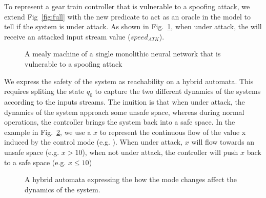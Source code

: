 To represent a gear train controller that is vulnerable to a spoofing attack, we extend Fig~\ref{fig:full} with the new predicate \isUnderAttack to act as an oracle in the model to tell if the system is under attack.
As shown in Fig.~\ref{fig:fullAtk}, when under attack, the \fullNN will receive an attacked input stream value ($speed_{ATK}$).

\begin{figure}[h!]
\centering
{}
\caption{A mealy machine of a single monolithic neural network that is vulnerable to a spoofing attack}
\label{fig:fullAtk}
\end{figure}

We express the safety of the system as reachability on a hybrid automata.
This requires spliting the state $q_0$ to capture the two different dynamics of the systems according to the inputs streams.
The inuition is that when under attack, the dynamics of the system approach some unsafe space, whereas during normal operations, the controller brings the system back into a safe space.
In the example in Fig.~\ref{fig:hybridGear}, we use a $\dot{x}$ to represent the continuous flow of the value x induced by the control mode (e.g. \fullNN).
When under attack, $x$ will flow towards an unsafe space (e.g. $x > 10$), when not under attack, the controller will push $x$ back to a safe space (e.g. $x\leq 10$)

\begin{figure}[h!]
\centering
{}
\caption{A hybrid automata expressing the how the mode changes affect the dynamics of the system.}
\label{fig:hybridGear}
\end{figure}

